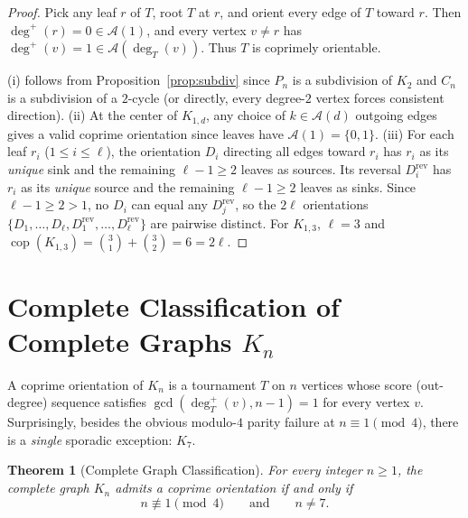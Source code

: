 \documentclass[11pt,a4paper]{article}
\newtheorem{theorem}{Theorem}[section]
\theoremstyle{definition}
\theoremstyle{remark}
\newcommand{\cop}{\operatorname{cop}}
\newcommand{\outdeg}{\deg^{+}}
\newcommand{\Aset}{\mathcal{A}}
\begin{document}
\begin{proof}
Pick any leaf $r$ of $T$, root $T$ at $r$, and orient every edge of $T$ toward $r$. Then $\outdeg(r) = 0 \in \Aset(1)$, and every vertex $v \neq r$ has $\outdeg(v) = 1 \in \Aset(\deg_T(v))$. Thus $T$ is coprimely orientable.

(i) follows from Proposition~\ref{prop:subdiv} since $P_n$ is a subdivision of $K_2$ and $C_n$ is a subdivision of a $2$-cycle (or directly, every degree-$2$ vertex forces consistent direction).
(ii) At the center of $K_{1,d}$, any choice of $k \in \Aset(d)$ outgoing edges gives a valid coprime orientation since leaves have $\Aset(1) = \{0, 1\}$.
(iii) For each leaf $r_i$ ($1 \le i \le \ell$), the orientation $D_i$ directing all edges toward $r_i$ has $r_i$ as its \emph{unique} sink and the remaining $\ell - 1 \ge 2$ leaves as sources. Its reversal $D_i^{\mathrm{rev}}$ has $r_i$ as its \emph{unique} source and the remaining $\ell - 1 \ge 2$ leaves as sinks. Since $\ell - 1 \ge 2 > 1$, no $D_i$ can equal any $D_j^{\mathrm{rev}}$, so the $2\ell$ orientations $\{D_1, \dots, D_\ell, D_1^{\mathrm{rev}}, \dots, D_\ell^{\mathrm{rev}}\}$ are pairwise distinct. For $K_{1,3}$, $\ell = 3$ and $\cop(K_{1,3}) = \binom{3}{1} + \binom{3}{2} = 6 = 2\ell$.
\end{proof}

\section{Complete Classification of Complete Graphs \texorpdfstring{$K_n$}{Kn}}

A coprime orientation of $K_n$ is a tournament $T$ on $n$ vertices whose score (out-degree) sequence satisfies $\gcd(\outdeg_T(v), n - 1) = 1$ for every vertex $v$. Surprisingly, besides the obvious modulo-$4$ parity failure at $n \equiv 1 \pmod{4}$, there is a \emph{single} sporadic exception: $K_7$.

\begin{theorem}[Complete Graph Classification]\label{thm:Kn}
For every integer $n \ge 1$, the complete graph $K_n$ admits a coprime orientation if and only if
\[
  n \not\equiv 1 \pmod{4} \qquad \text{and} \qquad n \neq 7.
\]
\end{theorem}
\end{document}
